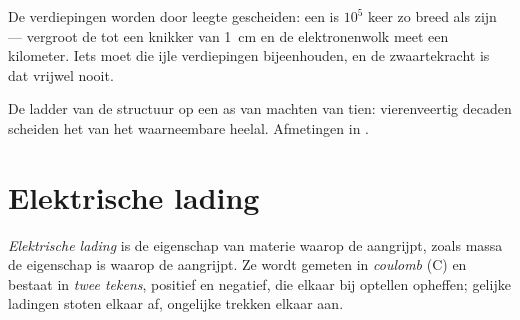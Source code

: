 \begin{remark}\label{rem:g11:fundamental-interactions:empty}
De verdiepingen worden door leegte gescheiden: een  is $10^{5}$ keer
zo breed als zijn  --- vergroot de  tot een knikker van
\qty{1}{cm} en de elektronenwolk meet een kilometer. Iets moet die ijle
verdiepingen bijeenhouden, en de zwaartekracht is dat vrijwel nooit.
\end{remark}

\begin{omfigure}

{\small De ladder van de structuur op een as van machten van tien:
vierenveertig decaden scheiden het  van het waarneembare heelal.
Afmetingen in .}
\end{omfigure}

\section{Elektrische lading}

\begin{definition}\label{def:g11:fundamental-interactions:charge}
\emph{Elektrische lading} is de eigenschap van
materie waarop de  aangrijpt, zoals massa
de eigenschap is waarop de  aangrijpt. Ze wordt gemeten in
\emph{coulomb} (\unit{C}) en bestaat in \emph{twee
tekens}, positief en negatief, die elkaar bij optellen opheffen; gelijke
ladingen stoten elkaar af, ongelijke trekken elkaar aan.
\end{definition}

